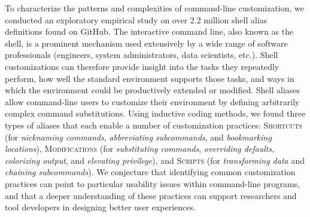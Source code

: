 To characterize the patterns and complexities of command-line customization, we conducted an exploratory empirical study on over 2.2 million shell alias definitions found on GitHub.
The interactive command line, also known as the shell, is a prominent mechanism used extensively by a wide range of software professionals (engineers, system administrators, data scientists, etc.). Shell customizations can therefore provide insight into the tasks they repeatedly perform, how well the standard environment supports those tasks, and ways in which the environment could be productively extended or modified.
Shell aliases allow command-line users to customize their environment by defining arbitrarily complex command substitutions.
Using inductive coding methods, we found three types of aliases that each enable a number of customization practices: 
\textsc{Shortcuts} (for \emph{nicknaming commands}, \emph{abbreviating subcommands}, and \emph{bookmarking locations}),
\textsc{Modifications} (for \emph{substituting commands}, \emph{overriding defaults}, \emph{colorizing output}, and \emph{elevating privilege}),
and \textsc{Scripts} (for \emph{transforming data} and \emph{chaining subcommands}).
We conjecture that identifying common customization practices can point to particular usability issues within command-line programs, and that a deeper understanding of these practices can support researchers and tool developers in designing better user experiences.